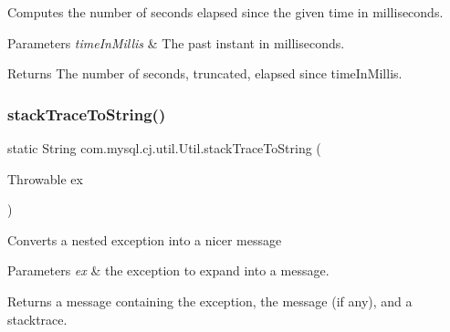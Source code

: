 Computes the number of seconds elapsed since the given time in milliseconds.


\begin{DoxyParams}{Parameters}
{\em time\+In\+Millis} & The past instant in milliseconds. \\
\hline
\end{DoxyParams}
\begin{DoxyReturn}{Returns}
The number of seconds, truncated, elapsed since time\+In\+Millis. 
\end{DoxyReturn}
\mbox{\label{classcom_1_1mysql_1_1cj_1_1util_1_1_util_af56476861014cdc8d214eb1440cfdf9e}} 
\subsubsection{\texorpdfstring{stack\+Trace\+To\+String()}{stackTraceToString()}}
{\footnotesize\ttfamily static String com.\+mysql.\+cj.\+util.\+Util.\+stack\+Trace\+To\+String (\begin{DoxyParamCaption}\item[{Throwable}]{ex }\end{DoxyParamCaption})\hspace{0.3cm}{\ttfamily [static]}}

Converts a nested exception into a nicer message


\begin{DoxyParams}{Parameters}
{\em ex} & the exception to expand into a message.\\
\hline
\end{DoxyParams}
\begin{DoxyReturn}{Returns}
a message containing the exception, the message (if any), and a stacktrace. 
\end{DoxyReturn}
\mbox{\label{classcom_1_1mysql_1_1cj_1_1util_1_1_util_a2f847b31da7b0217bf7c9dbbba3324db}} 
